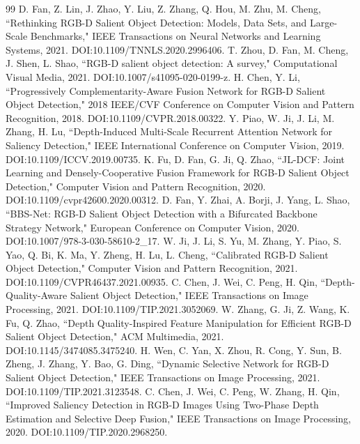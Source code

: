\documentclass[11pt]{article}
\begin{document}
\small
\begin{thebibliography}{99}
 D. Fan, Z. Lin, J. Zhao, Y. Liu, Z. Zhang, Q. Hou, M. Zhu, M. Cheng, ``Rethinking RGB-D Salient Object Detection: Models, Data Sets, and Large-Scale Benchmarks," IEEE Transactions on Neural Networks and Learning Systems, 2021. DOI:10.1109/TNNLS.2020.2996406.
 T. Zhou, D. Fan, M. Cheng, J. Shen, L. Shao, ``RGB-D salient object detection: A survey," Computational Visual Media, 2021. DOI:10.1007/s41095-020-0199-z.
 H. Chen, Y. Li, ``Progressively Complementarity-Aware Fusion Network for RGB-D Salient Object Detection," 2018 IEEE/CVF Conference on Computer Vision and Pattern Recognition, 2018. DOI:10.1109/CVPR.2018.00322.
 Y. Piao, W. Ji, J. Li, M. Zhang, H. Lu, ``Depth-Induced Multi-Scale Recurrent Attention Network for Saliency Detection," IEEE International Conference on Computer Vision, 2019. DOI:10.1109/ICCV.2019.00735.
 K. Fu, D. Fan, G. Ji, Q. Zhao, ``JL-DCF: Joint Learning and Densely-Cooperative Fusion Framework for RGB-D Salient Object Detection," Computer Vision and Pattern Recognition, 2020. DOI:10.1109/cvpr42600.2020.00312.
 D. Fan, Y. Zhai, A. Borji, J. Yang, L. Shao, ``BBS-Net: RGB-D Salient Object Detection with a Bifurcated Backbone Strategy Network," European Conference on Computer Vision, 2020. DOI:10.1007/978-3-030-58610-2\_17.
 W. Ji, J. Li, S. Yu, M. Zhang, Y. Piao, S. Yao, Q. Bi, K. Ma, Y. Zheng, H. Lu, L. Cheng, ``Calibrated RGB-D Salient Object Detection," Computer Vision and Pattern Recognition, 2021. DOI:10.1109/CVPR46437.2021.00935.
 C. Chen, J. Wei, C. Peng, H. Qin, ``Depth-Quality-Aware Salient Object Detection," IEEE Transactions on Image Processing, 2021. DOI:10.1109/TIP.2021.3052069.
 W. Zhang, G. Ji, Z. Wang, K. Fu, Q. Zhao, ``Depth Quality-Inspired Feature Manipulation for Efficient RGB-D Salient Object Detection," ACM Multimedia, 2021. DOI:10.1145/3474085.3475240.
 H. Wen, C. Yan, X. Zhou, R. Cong, Y. Sun, B. Zheng, J. Zhang, Y. Bao, G. Ding, ``Dynamic Selective Network for RGB-D Salient Object Detection," IEEE Transactions on Image Processing, 2021. DOI:10.1109/TIP.2021.3123548.
 C. Chen, J. Wei, C. Peng, W. Zhang, H. Qin, ``Improved Saliency Detection in RGB-D Images Using Two-Phase Depth Estimation and Selective Deep Fusion," IEEE Transactions on Image Processing, 2020. DOI:10.1109/TIP.2020.2968250.

\end{thebibliography}
\end{document}
